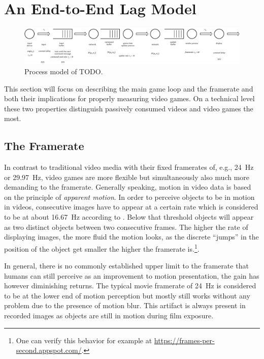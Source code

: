 \section{An End-to-End Lag Model}
\label{sec:model}


\begin{figure}[!t]
	\centering
	\includegraphics[width=1.0\columnwidth]{../models/e2e-lag-model.pdf}
	\caption{Process model of TODO.}
\label{fig:queuing-model}
\end{figure}



This section will focus on describing the main game loop and the framerate and both their implications for properly measuring video games. On a technical level these two properties distinguish passively consumed videos and video games the most.


\subsection{The Framerate}
\label{sec:framerate}

In contrast to traditional video media with their fixed framerates of, e.g., \SI{24}{\hertz} or \SI{29.97}{\hertz}, video games are more flexible but simultaneously also much more demanding to the framerate. Generally speaking, motion in video data is based on the principle of \textit{apparent motion}. In order to perceive objects to be in motion in videos, consecutive images have to appear at a certain rate which is considered to be at about \SI{16.67}{\hertz} according to \cite{wertheimer1912experimentelle}. Below that threshold objects will appear as two distinct objects between two consecutive frames. %
The higher the rate of displaying images, the more fluid the motion looks, as the discrete ``jumps'' in the position of the object get smaller the higher the framerate is.\footnote{One can verify this behavior for example at \url{https://frames-per-second.appspot.com/}.}.

In general, there is no commonly established upper limit to the framerate that humans can still perceive as an improvement to motion presentation, the gain has however diminishing returns. The typical movie framerate of \SI{24}{\hertz} is considered to be at the lower end of motion perception but mostly still works without any problem due to the presence of motion blur. This artifact is always present in recorded images as objects are still in motion during film exposure. %

